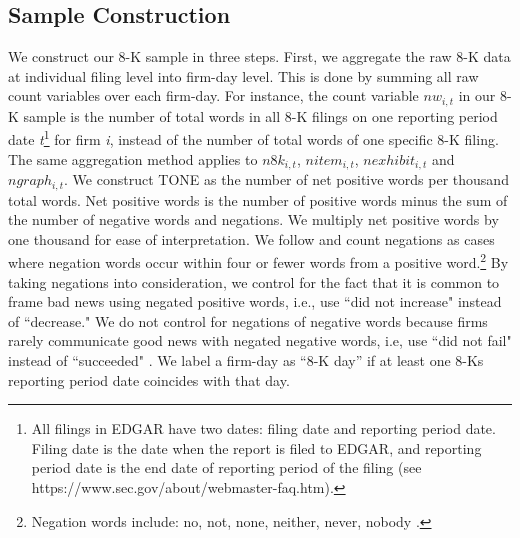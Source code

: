 \documentclass[letterpaper,12pt]{article}
\begin{document}
\begin{spacing}{1.5}
\subsection{Sample Construction} \label{sec3.3}
\noindent We construct our 8-K sample in three steps. First, we aggregate the raw 8-K data at individual filing level into firm-day level. This is done by summing all raw count variables over each firm-day. For instance, the count variable $nw_{i,t}$ in our 8-K sample is the number of total words in all 8-K filings on one reporting period date \textit{t}\footnote{All filings in EDGAR have two dates: filing date and reporting period date. Filing date is the date when the report is filed to EDGAR, and reporting period date is the end date of reporting period of the filing (see https://www.sec.gov/about/webmaster-faq.htm).} for firm \textit{i}, instead of the number of total words of one specific 8-K filing. The same aggregation method applies to $n8k_{i,t}$, $nitem_{i,t}$, $nexhibit_{i,t}$ and $ngraph_{i,t}$. We construct TONE as the number of net positive words per thousand total words. Net positive words is the number of positive words minus the sum of the number of negative words and negations. We multiply net positive words by one thousand for ease of interpretation. We follow  and count negations as cases where negation words occur within four or fewer words from a positive word.\footnote{Negation words include: no, not, none, neither, never, nobody \cite{tottieNegationEnglishSpeech1991}.} By taking negations into consideration, we control for the fact that it is common to frame bad news using negated positive words, i.e., use ``did not increase" instead of ``decrease." We do not control for negations of negative words because firms rarely communicate good news with negated negative words, i.e, use ``did not fail" instead of ``succeeded" \cite{loughranWhenLiabilityNot2011}. We label a firm-day as ``8-K day” if at least one 8-Ks reporting period date coincides with that day.


\end{spacing}
\end{document}
